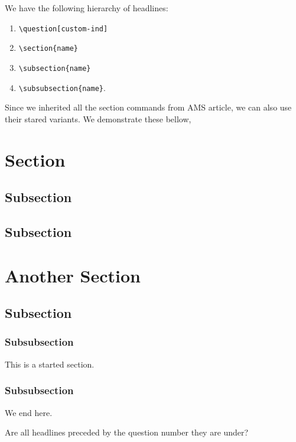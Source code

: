 \documentclass{homework}
\newcommand*{\bk}{\textbackslash}
\renewcommand\tt[1]{\texttt{#1}}
\begin{document}
\begin{sol}
  We have the following hierarchy of headlines:
  \begin{enumerate}
    \item \tt{\bk question[custom-ind]}
    \item \tt{\bk section\{name\}}
    \item \tt{\bk subsection\{name\}}
    \item \tt{\bk subsubsection\{name\}}.
  \end{enumerate}

  Since we inherited all the section commands from AMS article, we can
  also use their stared variants. We demonstrate these bellow,
  \section{Section}
  \subsection{Subsection}
  \subsection{Subsection}
  \section{Another Section}
  \subsection{Subsection}
  \subsubsection*{Subsubsection} This is a started section.
  \subsubsection{Subsubsection} We end here.
\end{sol}

\question Are all headlines preceded by the question number they are under?
\end{document}
